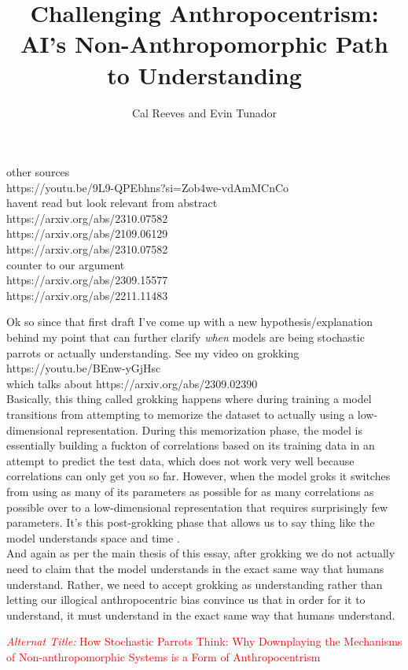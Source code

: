 \documentclass{article}
\title{Challenging Anthropocentrism: AI's Non-Anthropomorphic Path to Understanding}
\author{Cal Reeves and Evin Tunador}
\begin{document}
other sources\\
https://youtu.be/9L9-QPEbhns?si=Zob4we-vdAmMCnCo\\
havent read but look relevant from abstract\\
https://arxiv.org/abs/2310.07582\\
https://arxiv.org/abs/2109.06129\\
https://arxiv.org/abs/2310.07582\\
counter to our argument\\
https://arxiv.org/abs/2309.15577 \\
https://arxiv.org/abs/2211.11483 \\
\vspace{2in}

Ok so since that first draft I've come up with a new hypothesis/explanation behind my point that can further clarify \textit{when} models are being stochastic parrots or actually understanding. See my video on grokking \\
https://youtu.be/BEnw-yGjHsc \\
which talks about https://arxiv.org/abs/2309.02390 \\
Basically, this thing called grokking happens where during training a model transitions from attempting to memorize the dataset to actually using a low-dimensional representation. During this memorization phase, the model is essentially building a fuckton of correlations based on its training data in an attempt to predict the test data, which does not work very well because correlations can only get you so far. However, when the model groks it switches from using as many of its parameters as possible for as many correlations as possible over to a low-dimensional representation that requires surprisingly few parameters. It's this post-grokking phase that allows us to say thing like the model understands space and time \cite{tegmark2023spacetime}. \\
And again as per the main thesis of this essay, after grokking we do not actually need to claim that the model understands in the exact same way that humans understand. Rather, we need to accept grokking as understanding rather than letting our illogical anthropocentric bias convince us that in order for it to understand, it must understand in the exact same way that humans understand. 

\newpage
\maketitle
\begin{center}\textcolor{red}{\textit{Alternat Title:} How Stochastic Parrots Think: Why Downplaying the Mechanisms of Non-anthropomorphic Systems is a Form of Anthropocentrism}\end{center}
\end{document}

